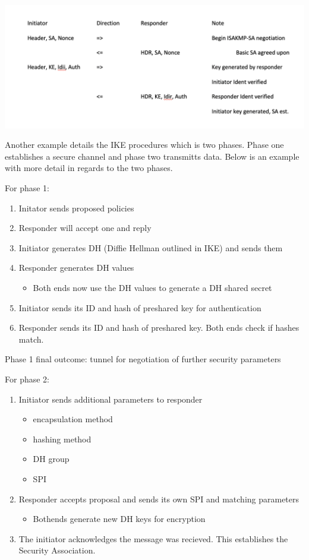 \documentclass{report}
\newcommand{\squash}{\itemsep=0pt\parskip=0pt}
\begin{document}
\begin{itemize}
\includegraphics[width=\textwidth] {ISAKMP_Neg_Procedure}

Another example details the IKE procedures which is two phases. Phase one establishes a secure channel and phase two transmitts data. Below is an example  with more detail in regards to the two phases.

For phase 1:
\begin{enumerate}
\item Initator sends proposed policies
\item Responder will accept one and reply
\item Initiator generates DH (Diffie Hellman outlined in IKE) and sends them
\item Responder generates DH values
  \begin{itemize}
  \item Both ends now use the DH values to generate a DH shared secret
  \end{itemize}
\item Initiator sends its ID and hash of preshared key for authentication
\item Responder sends its ID and hash of preshared key. Both ends check if hashes match.
\end{enumerate}

Phase 1 final outcome: tunnel for negotiation of further security parameters

For phase 2:
\begin{enumerate}
  \item Initiator sends additional parameters to responder
    \begin{itemize}
      \squash
    \item encapsulation method
    \item hashing method
    \item DH group
    \item SPI
    \end{itemize}
  \item Responder accepts proposal and sends its own SPI and matching parameters
    \begin{itemize}
    \item Bothends generate new DH keys for encryption
    \end{itemize}
  \item The initiator acknowledges the message was recieved. This establishes the Security Association.
\end{enumerate}


\end{itemize}
\end{document}
